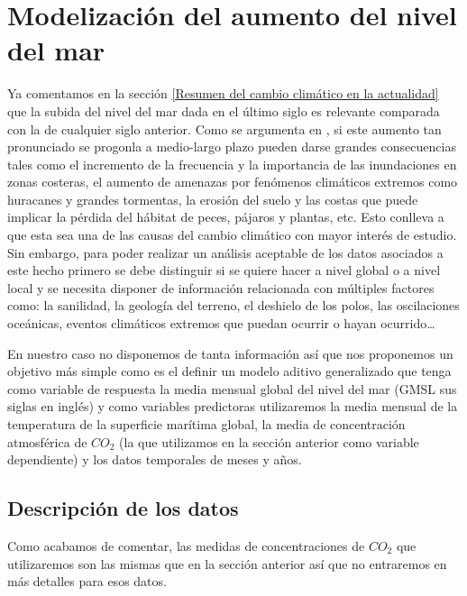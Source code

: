\documentclass[12pt,a4paper,]{book}
\numberwithin{dummy}{section}
\theoremstyle{ocrenumbox}
\theoremstyle{blacknumex}
\theoremstyle{blacknumbox}
\theoremstyle{ocrenum}
\theoremstyle{ocrenum}
\begin{document}
\hypertarget{modelizaciuxf3n-del-aumento-del-nivel-del-mar}{%
\section{Modelización del aumento del nivel del
mar}\label{modelizaciuxf3n-del-aumento-del-nivel-del-mar}}

Ya comentamos en la sección
\ref{Resumen del cambio climático en la actualidad} que la subida del
nivel del mar dada en el último siglo es relevante comparada con la de
cualquier siglo anterior. Como se argumenta en \citet{SeaLevelEffects} ,
si este aumento tan pronunciado se progonla a medio-largo plazo pueden
darse grandes consecuencias tales como el incremento de la frecuencia y
la importancia de las inundaciones en zonas costeras, el aumento de
amenazas por fenómenos climáticos extremos como huracanes y grandes
tormentas, la erosión del suelo y las costas que puede implicar la
pérdida del hábitat de peces, pájaros y plantas, etc. Esto conlleva a
que esta sea una de las causas del cambio climático con mayor interés de
estudio. Sin embargo, para poder realizar un análisis aceptable de los
datos asociados a este hecho primero se debe distinguir si se quiere
hacer a nivel global o a nivel local y se necesita disponer de
información relacionada con múltiples factores como: la sanilidad, la
geología del terreno, el deshielo de los polos, las oscilaciones
oceánicas, eventos climáticos extremos que puedan ocurrir o hayan
ocurrido\ldots{}

En nuestro caso no disponemos de tanta información así que nos
proponemos un objetivo más simple como es el definir un modelo aditivo
generalizado que tenga como variable de respuesta la media mensual
global del nivel del mar (GMSL sus siglas en inglés) y como variables
predictoras utilizaremos la media mensual de la temperatura de la
superficie marítima global, la media de concentración atmosférica de
\(CO_2\) (la que utilizamos en la sección anterior como variable
dependiente) y los datos temporales de meses y años.

\hypertarget{descripciuxf3n-de-los-datos-1}{%
\subsection{Descripción de los
datos}\label{descripciuxf3n-de-los-datos-1}}

Como acabamos de comentar, las medidas de concentraciones de \(CO_2\)
que utilizaremos son las mismas que en la sección anterior así que no
entraremos en más detalles para esos datos.
\end{document}
